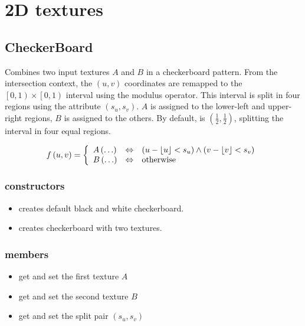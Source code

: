 \section{2D textures} %



\subsection{CheckerBoard}\label{textures.CheckerBoard}

Combines two input textures $A$ and $B$ in a checkerboard pattern.  From the intersection context, the $\left(u, v\right)$ coordinates are remapped to the $\left[0, 1\right) \times \left[0, 1\right)$ interval using the modulus operator.  This interval is split in four regions using the  attribute $\left(s_u, s_v\right)$.  $A$ is assigned to the lower-left and upper-right regions, $B$ is assigned to the others.  By default,  is $\left(\frac 1 2, \frac 1 2\right)$, splitting the interval in four equal regions.

\begin{equation}
	f\left(u, v\right) = \left\{
		\begin{array}{lcl}
			A\left(\ldots\right) & \Leftrightarrow & 
				\left(u - \left\lfloor u \right\rfloor < s_u\right) \wedge
				\left(v - \left\lfloor v \right\rfloor < s_v\right) \\
			B\left(\ldots\right) & \Leftrightarrow & \textnormal{otherwise}
		\end{array}
	\right.
\end{equation}

\subsubsection*{constructors}
\begin{itemize}
	\item {} 
		creates default black and white checkerboard.
	\item {} 
		creates checkerboard with two textures.
\end{itemize}

\subsubsection*{members}
\begin{itemize}
	\item {} 
		get and set the first texture $A$
	\item {} 
		get and set the second texture $B$
	\item {} 
		get and set the split pair $\left(s_u, s_v\right)$
\end{itemize}



